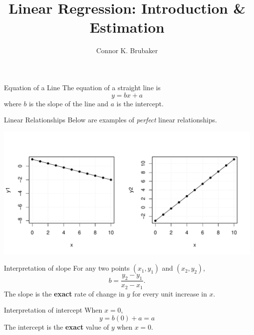 \documentclass{beamer}
\title{Linear Regression: Introduction \& Estimation}
\author{Connor K. Brubaker}
\institute{
Department of Statistics \\
Texas A\&M University
}
\date{}
\begin{document}
\maketitle

\begin{frame}{Equation of a Line}
    The equation of a straight line is 
    \begin{equation*}
        y = bx + a
    \end{equation*}
    where $b$ is the slope of the line and $a$ is the intercept.
\end{frame}

\begin{frame}{Linear Relationships}
    Below are examples of \textit{perfect} linear relationships.
    \begin{center}
        \includegraphics[width=\linewidth]{figures/perfect_linear.pdf}
    \end{center}
\end{frame}

\begin{frame}{Interpretation of slope}
    For any two points $(x_1, y_1)$ and $(x_2, y_2)$,
    \begin{equation*}
        b = \frac{y_2 - y_1}{x_2 - x_1}.
    \end{equation*}
    The slope is the \textbf{exact} rate of change in $y$ for every unit increase in $x$.
\end{frame}

\begin{frame}{Interpretation of intercept}
    When $x = 0$,
    \begin{equation*}
        y = b(0) + a = a
    \end{equation*}
    The intercept is the \textbf{exact} value of $y$ when $x = 0$. 
\end{frame}
\end{document}
